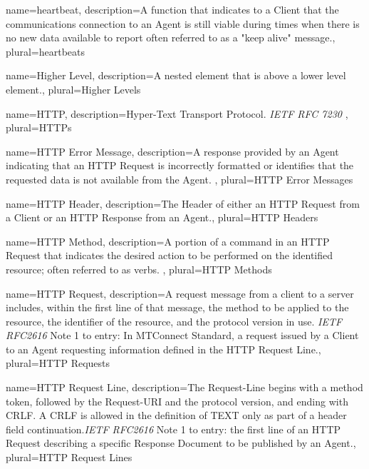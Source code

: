 {
    name={heartbeat},
	description={A function that indicates to a \gls{Client} that the communications connection to an \gls{Agent} is still viable during times when there is no new data available to report  often referred to as a "keep alive" message.},
	plural={heartbeats}
}

{
    name={Higher Level},
	description={A nested element that is above a lower level element.},
	plural={Higher Levels}
}

{
    name={HTTP},
	description={Hyper-Text Transport Protocol. \textit{IETF RFC 7230}
},
	plural={HTTPs}
}

{
    name={HTTP Error Message},
	description={A response provided by an \gls{Agent} indicating that an \gls{HTTP Request} is incorrectly formatted or identifies that the requested data is not available from the \gls{Agent}. },
	plural={HTTP Error Messages}
}

{
    name={HTTP Header},
	description={The \gls{Header} of either an \gls{HTTP Request} from a \gls{Client} or an \gls{HTTP Response} from an \gls{Agent}.},
	plural={HTTP Headers}
}

{
    name={HTTP Method},
	description={A portion of a command in an \gls{HTTP Request} that indicates the desired action to be performed on the identified resource; often referred to as verbs.
},
	plural={HTTP Methods}
}

{
    name={HTTP Request},
	description={A request message from a client to a server includes, within the first line of that message, the method to be applied to the resource, the identifier of the resource, and the protocol version in use. \textit{IETF RFC2616}
Note 1 to entry: In MTConnect Standard, a request issued by a \gls{Client} to an \gls{Agent} requesting information defined in the \gls{HTTP Request Line}.},
	plural={HTTP Requests}
}

{
    name={HTTP Request Line},
	description={The Request-Line begins with a method token, followed by the Request-URI and the protocol version, and ending with CRLF. A CRLF is allowed in the definition of TEXT only as part of a header field continuation.\textit{IETF RFC2616}
Note 1 to entry: the first line of an \gls{HTTP Request} describing a specific \gls{Response Document} to be published by an \gls{Agent}.},
	plural={HTTP Request Lines}
}

